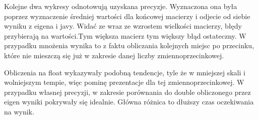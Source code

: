 \documentclass[8pt]{article}
\begin{document}
Kolejne dwa wykresy odnotowują uzyskana precyzje. Wyznaczona ona była poprzez wyznaczenie średniej wartości
dla końcowej macierzy i odjecie od siebie wyniku z eigena i javy. Widać ze wraz ze wzrostem wielkości macierzy,
błędy przybierają na wartości.Tym większa macierz tym większy błąd ostateczny. W przypadku mnożenia wynika to z
faktu obliczania kolejnych miejsc po przecinku, które nie mieszczą się już w zakresie danej liczby zmiennoprzecinkowej.
\begin{center}
\end{center}

Obliczenia na float wykazywały podobną tendencje, tyle że w mniejszej skali i wolniejszym tempie, więc pominę prezentacje dla tej zmiennoprzecinkowej.
W przypadku własnej precyzji, w zakresie porównania do double obliczonego przez eigen wyniki pokrywały się idealnie. Główna różnica to dłuższy czas oczekiwania na wynik.

\begin{center}
\end{center}
\end{document}
